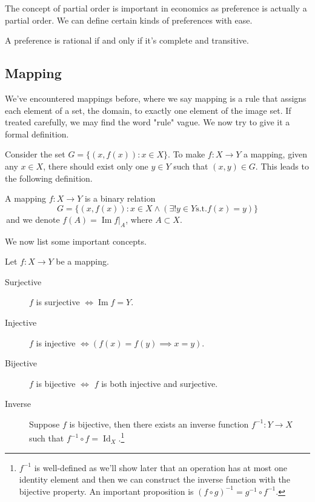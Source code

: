 The concept of partial order is important in economics as preference is actually a partial order. We can define certain kinds of preferences with ease.
\begin{definition}
    A preference is rational if and only if it's complete and transitive.
\end{definition}

\subsection{Mapping}
We've encountered mappings before, where we say mapping is a rule that assigns each element of a set, the domain, to exactly one element of the image set. 
If treated carefully, we may find the word "rule" vague. We now try to give it a formal definition. 

Consider the set $G=\{(x,f(x)):x\in X\}$. To make $f:X \to Y$ a mapping, given any $x \in X$, there should exist only one $y \in Y$ such that $(x,y) \in G$. This leads to the following definition.
\begin{definition}[Mapping]
    A mapping $f:X\to Y$ is a binary relation $$G=\{(x,f(x)) : x \in X \land (\exists ! y \in Y \text{s.t.} f(x) = y)\}$$
    \,and we denote $f(A) = \operatorname{Im}f|_A$, where $A \subset X$.
\end{definition}

We now list some important concepts.
\begin{definition}
    Let $f:X\to Y$ be a mapping.
    \begin{description}
        \item[Surjective] $f$ is surjective $\iff \operatorname{Im} f = Y.$
        \item[Injective] $f$ is injective $\iff (f(x) = f(y) \implies x = y).$  
        \item[Bijective] $f$ is bijective $\iff$ $f$ is both injective and surjective.
        \item[Inverse] Suppose $f$ is bijective, then there exists an inverse function $f^{-1}: Y\to X$ such that $f^{-1} \circ f = \operatorname{Id}_{X}.$\footnote{$f^{-1}$ is well-defined as we'll show later that an operation has at most one identity element and then we can construct the inverse function with the bijective property. An important
        proposition is $(f\circ g)^{-1}= g^{-1}\circ f^{-1}$.} 
    \end{description}
\end{definition}

